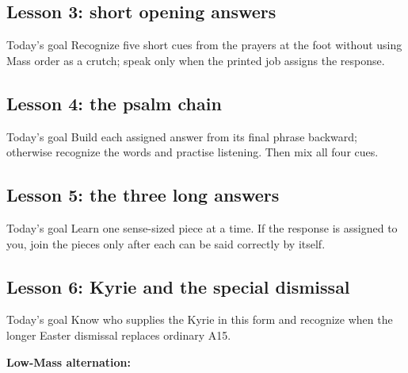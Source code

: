 \subsection{Lesson 3: short opening answers}
\begin{learnerbox}{Today's goal}
Recognize five short cues from the prayers at the foot without using Mass
order as a crutch; speak only when the printed job assigns the response.
\par\smallskip
{}
\end{learnerbox}

\subsection{Lesson 4: the psalm chain}
\begin{learnerbox}{Today's goal}
Build each assigned answer from its final phrase backward; otherwise recognize
the words and practise listening. Then mix all four cues.
\par\smallskip
{}
\end{learnerbox}

\subsection{Lesson 5: the three long answers}
\begin{learnerbox}{Today's goal}
Learn one sense-sized piece at a time. If the response is assigned to you,
join the pieces only after each can be said correctly by itself.
\par\smallskip
{}
\end{learnerbox}
\PrintAightAnswer
{}

\subsection{Lesson 6: Kyrie and the special dismissal}
\begin{learnerbox}{Today's goal}
Know who supplies the Kyrie in this form and recognize when the longer Easter
dismissal replaces ordinary A15.
\ifLowMassGuide\par\smallskip\textbf{Low-Mass alternation:}
\LowMassKyriePattern\fi
\par\smallskip
{}
\end{learnerbox}


